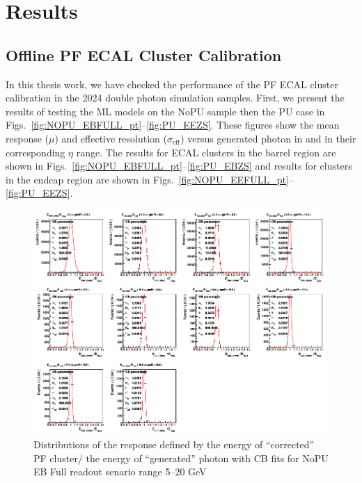 \section{Results}

\subsection{Offline PF ECAL Cluster Calibration}

In this thesis work,
we have checked the performance of the PF ECAL cluster calibration in the 2024 double photon simulation samples.
First, we present the results of testing the ML models on the NoPU sample then the PU case in Figs.~\ref{fig:NOPU_EBFULL_pt}--\ref{fig:PU_EEZS}.
These figures show the mean response ($\mu$) and effective resolution ($\sigma_\mathrm{eff}$) versus generated photon \pt in \GeV and in their corresponding $\eta$ range.
The results for ECAL clusters in the barrel region are shown in Figs.~\ref{fig:NOPU_EBFULL_pt}--\ref{fig:PU_EBZS}
and results for clusters in the endcap region are shown in Figs.~\ref{fig:NOPU_EEFULL_pt}--\ref{fig:PU_EEZS}.

\begin{figure}[t!]
\centering
\includegraphics[width=0.99\textwidth]{./plots_pdf/ECAL_plots/plotsNoPU/EB/FULL/png/EBFULL_GENPT_0005_0020_PerBinFitEcor91formula}
\caption[Distributions of energy response with with CB fits for PF ECAL cluster calibrated using 2024 condition]{Distributions of the response defined by the energy of ``corrected'' PF cluster/ the energy of ``generated'' photon with CB fits for NoPU EB Full readout senario \pt range  5--20 GeV}
\label{fig:Response_distrubution}
\end{figure}

